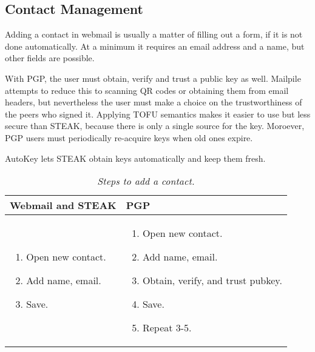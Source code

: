 \subsection{Contact Management}

Adding a contact in webmail is usually a matter of filling out a form, if it is not done automatically.  At a minimum it requires an email address and a name, but other fields are possible.

With PGP, the user must obtain, verify and trust a public key as well.  Mailpile attempts to reduce this to scanning QR codes or obtaining them from email headers, but nevertheless the user must make a choice on the trustworthiness of the peers who signed it.  Applying TOFU semantics makes it easier to use but less secure than STEAK, because there is only a single source for the key.  Moroever, PGP users must periodically re-acquire keys when old ones expire.

AutoKey lets STEAK obtain keys automatically and keep them fresh.

\begin{table}[ht!]
\begin{tabular}{ | L{3.5cm} | L{3.5cm} |}
\hline
\textbf{Webmail and STEAK} & \textbf{PGP} \\
\hline
\vspace{-3mm}
\begin{enumerate}
  \item{Open new contact.}
  \item{Add name, email.} 
  \item{Save.}
\end{enumerate} 
\vspace{-\topsep} &

\vspace{-3mm}
\begin{enumerate}
  \item{Open new contact.}
  \item{Add name, email.}
  \item{Obtain, verify, and trust pubkey.}
  \item{Save.}
  \item{Repeat 3-5.}
\end{enumerate} 
\vspace{-\topsep} \\

\hline
\end{tabular}
\caption{\it Steps to add a contact.}
\label{tab:account-creation}
\end{table}

